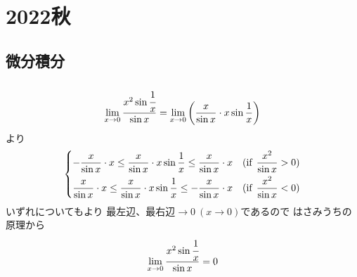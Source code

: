 \newpage
\section{2022秋}

\setcounter{yearcounter}{2022}


\subsection{微分積分}
\begin{ans*}
  ${}$
  \begin{gather}
    \lim_{x\to 0}\frac{x^2\sin\cfrac{1}{x}}{\sin x}
    = \lim_{x\to 0}\left(\frac{x}{\sin x}\cdot x\sin\frac{1}{x}\right)
  \end{gather}
  より
  \begin{gather}
    \begin{dcases}
      -\frac{x}{\sin x}\cdot x
      \leq \frac{x}{\sin x}\cdot x\sin\frac{1}{x}
      \leq \frac{x}{\sin x}\cdot x
      & (\text{if\:\:} \frac{x^2}{\sin x} > 0) \\
      \frac{x}{\sin x}\cdot x
      \leq \frac{x}{\sin x}\cdot x\sin\frac{1}{x}
      \leq -\frac{x}{\sin x}\cdot x
      & (\text{if\:\:} \frac{x^2}{\sin x} < 0)
    \end{dcases}
  \end{gather}
  いずれについてもより
  最左辺、最右辺$\longrightarrow 0\:(x\to 0)$であるので
  はさみうちの原理から
  \begin{gather}
    \lim_{x\to 0}\frac{x^2 \sin \cfrac{1}{x}}{\sin x} = 0
  \end{gather}
\end{ans*}



